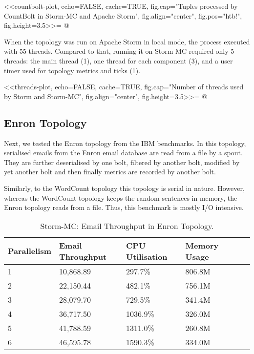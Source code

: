 <<countbolt-plot, echo=FALSE, cache=TRUE, fig.cap="Tuples processed by CountBolt in Storm-MC and Apache Storm", fig.align="center", fig.pos="htb!", fig.height=3.5>>=
@


When the topology was run on Apache Storm in local mode, the process executed with 55 threads. Compared to that, running it on Storm-MC required only 5 threads: the main thread (1), one thread for each component (3), and a user timer used for topology metrics and ticks (1).


<<threads-plot, echo=FALSE, cache=TRUE, fig.cap="Number of threads used by Storm and Storm-MC", fig.align="center", fig.height=3.5>>=
@

\subsection{Enron Topology}

Next, we tested the Enron topology from the IBM benchmarks. In this topology, serialised emails from the Enron email database are read from a file by a spout. They are further deserialised by one bolt, filtered by another bolt, modified by yet another bolt and then finally metrics are recorded by another bolt.

Similarly, to the WordCount topology this topology is serial in nature. However, whereas the WordCount topology keeps the random sentences in memory, the Enron topology reads from a file. Thus, this benchmark is mostly I/O intensive.


\medskip
\begin{table}[!htb]
\begin{adjustwidth}{-0.5in}{-0.5in}
\centering
\small
\begin{tabular}{@{}llllll@{}}
    {Parallelism} & {Email Throughput} & {CPU Utilisation} & {Memory Usage} \\ \toprule
    1 & {10,868.89} & {297.7\%} & {806.8M} \\
    2 & {22,150.44} & {482.1\%} & {756.1M} \\
    3 & {28,079.70} & {729.5\%} & {341.4M} \\
    4 & {36,717.50} & {1036.9\%} & {326.0M} \\
    5 & {41,788.59} & {1311.0\%} & {260.8M} \\
    6 & {46,595.78} & {1590.3\%} & {334.0M} \\
\end{tabular}
\caption{Storm-MC: Email Throughput in Enron Topology.}
\end{adjustwidth}
\label{table:storm_mc_enron}
\end{table}
\medskip	


